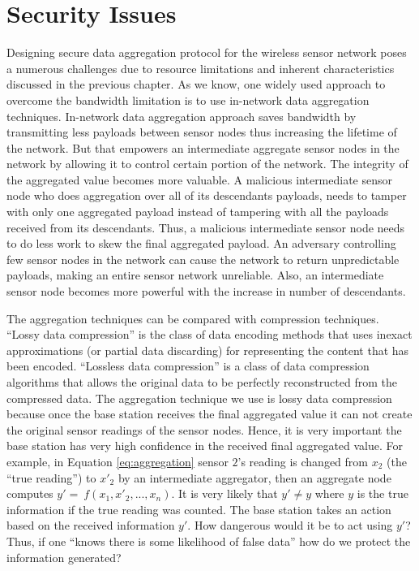 \section{Security Issues}
	Designing secure data aggregation protocol for the wireless sensor network poses a numerous challenges due to resource limitations and inherent characteristics discussed in the previous chapter. 
	As we know, one widely used approach to overcome the bandwidth limitation is to use in-network data aggregation techniques.
	In-network data aggregation approach saves bandwidth by transmitting less payloads between sensor nodes thus increasing the lifetime of the network.
	But that empowers an intermediate aggregate sensor nodes in the network by allowing it to control certain portion of the network.
	The integrity of the aggregated value becomes more valuable.
	A malicious intermediate sensor node who does aggregation over all of its descendants payloads, needs to tamper with only one aggregated payload instead of tampering with all the payloads received from its descendants. 
	Thus, a malicious intermediate sensor node needs to do less work to skew the final aggregated payload.
	An adversary controlling few sensor nodes in the network can cause the network to return unpredictable payloads, making an entire sensor network unreliable.
	Also, an intermediate sensor node becomes more powerful with the increase in number of descendants.

	The aggregation techniques can be compared with compression techniques.
	``Lossy data compression'' is the class of data encoding methods that uses inexact approximations (or partial data discarding) for representing the content that has been encoded. 
	``Lossless data compression'' is a class of data compression algorithms that allows the original data to be perfectly reconstructed from the compressed data.
	The aggregation technique we use is lossy data compression because once the base station receives the final aggregated value it can not create the original sensor readings of the sensor nodes.
	Hence, it is very important the base station has very high confidence in the received final aggregated value. 
	For example, in Equation \ref{eq:aggregation} sensor $2$'s reading is changed from $x_{2}$ (the ``true reading'') to $x'_{2}$ by an intermediate aggregator, then an aggregate node computes $y' =\ f(x_{1},x'_{2},...,x_{n})$.
	It is very likely that $y' \neq y$ where $y$ is the true information if the true reading was counted.
	The base station takes an action based on the received information $y'$.
	How dangerous would it be to act using $y'$?
	Thus, if one ``knows there is some likelihood of false data'' how do we protect the information generated?
	
